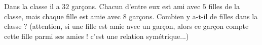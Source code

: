 
\begin{exercice}\label{exosmath-0766}

Dans la classe il a $32$ garçons. Chacun d'entre eux est ami avec $5$ filles de la classe, mais chaque fille est amie avec $8$ garçons. Combien y a-t-il de filles dans la classe ? (attention, si une fille est amie avec un garçon, alors ce garçon compte cette fille parmi ses amies ! c'est une relation symétrique...)

\end{exercice}
